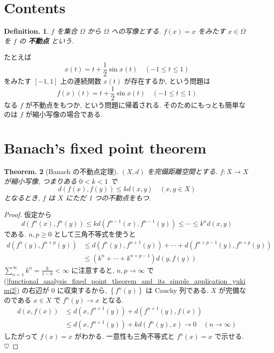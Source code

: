 \documentclass[openany, a4paper, oneside]{book}
\theoremstyle{break}
\newtheorem{thm}{Theorem.}[section]
\theoremstyle{breakdefn}
\newtheorem{defn}[thm]{Definition.}
\newcommand{\rbk}[1]{\left (#1\right)}
\newcommand{\cbk}[1]{\left\{#1\right\}}
\begin{document}
\section{Contents}
\label{sec-7-5-2}

\begin{defn}
 $f$ を集合 $\Omega$ から $\Omega$ への写像とする.
 $f (x)=x$ をみたす $x \in \Omega$ を $f$ の \textbf{不動点} という.
\end{defn}

たとえば
\begin{equation}
 x (t)
 =
 t + \frac{1}{2} \sin x (t) \quad (-1 \le t \le 1)
\end{equation}
をみたす $[-1, 1]$ 上の連続関数  $x (t)$  が存在するか, という問題は
\begin{equation}
 f (x) (t)
 =
 t + \frac{1}{2} \sin x (t) \quad  (-1 \le t \le 1)
\end{equation}
なる $f$ が不動点をもつか, という問題に帰着される.
そのためにもっとも簡単なのは $f$ が縮小写像の場合である.
\section{Banach's fixed point theorem}
\label{sec-7-5-3}

\begin{thm}[Banach の不動点定理]
 $(X, d)$ を完備距離空間とする.
 $f \colon X \to X$ が縮小写像, つまりある $0 < k <1$ で
 \begin{equation}
  d (f (x), f (y))
  \le
  kd (x, y) \quad  (x, y \in X)
 \end{equation}
 となるとき, $f$ は $X$ にただ 1 つの不動点をもつ.
\end{thm}
\begin{proof}
仮定から
\begin{equation}
 d (f^n (x), f^n (y))
 \le
 kd \rbk{f^{n-1}(x), f^{n-1}(y)}
 \le
 \cdots
 \le
 k^nd (x, y)
\end{equation}
である.
$n, p \ge 0$ として三角不等式を使うと
\begin{align}\label{functional_analysis_fixed_point_theorem_and_its_simple_application_yukimi2}
 d (f^n (y), f^{n+p}(y))
 &\le d (f^n (y), f^{n+1}(y)) + \cdots
  +d (f^{n+p-1}(y), f^{n+p}(y))  \\
 &\le
 \rbk{k^n + \cdots + k^{n+p-1}} d (y, f (y))
\end{align}
$\sum_{n=1}^{\infty} k^n = \frac{k}{1-k} < \infty$ に注意すると,
$n, p \to \infty$ で (\ref{functional_analysis_fixed_point_theorem_and_its_simple_application_yukimi2}) の右辺が $0$ に収束するから,
$\cbk{f^n (y)}$ は Cauchy 列である.
$X$ が完備なのである $x \in X$ で $f^n (y) \to x$ となる.
\begin{align}
 d(x, f (x))
 &\le
 d (x, f^{n+1}(y)) + d (f^{n+1}(y), f (x))  \\
 &\le
 d (x, f^{n+1}(y)) + kd (f^n (y), x) \to 0 \quad \rbk{n \to \infty}
\end{align}
したがって $f (x) = x$ がわかる.
一意性も三角不等式と $f^n (x) = x$ で示せる.
$\heartsuit$
\end{proof}
\end{document}
